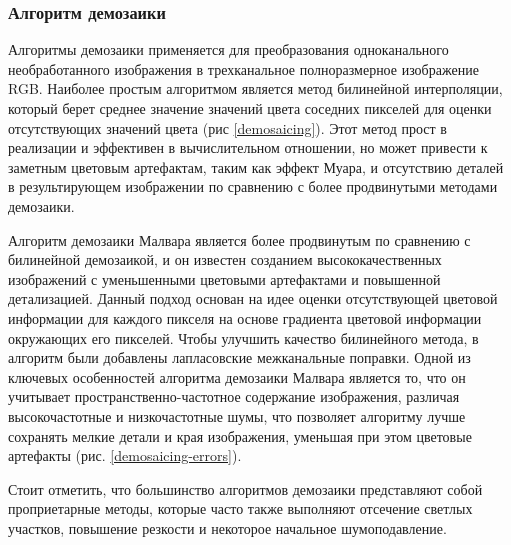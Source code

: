 \subsubsection{Алгоритм демозаики}

Алгоритмы демозаики \cite{lib-demosaic} применяется для преобразования одноканального необработанного изображения в трехканальное полноразмерное изображение RGB. Наиболее простым алгоритмом является метод билинейной интерполяции, который берет среднее значение значений цвета соседних пикселей для оценки отсутствующих значений цвета (рис \ref{demosaicing}). Этот метод прост в реализации и эффективен в вычислительном отношении, но может привести к заметным цветовым артефактам, таким как эффект Муара, и отсутствию деталей в результирующем изображении по сравнению с более продвинутыми методами демозаики.


Алгоритм демозаики Малвара является более продвинутым по сравнению с билинейной демозаикой, и он известен созданием высококачественных изображений с уменьшенными цветовыми артефактами и повышенной детализацией. Данный подход основан на идее оценки отсутствующей цветовой информации для каждого пикселя на основе градиента цветовой информации окружающих его пикселей. Чтобы улучшить качество билинейного метода, в алгоритм были добавлены лапласовские межканальные поправки. Одной из ключевых особенностей алгоритма демозаики Малвара является то, что он учитывает пространственно-частотное содержание изображения, различая высокочастотные и низкочастотные шумы, что позволяет алгоритму лучше сохранять мелкие детали и края изображения, уменьшая при этом цветовые артефакты (рис. \ref{demosaicing-errors}).


Стоит отметить, что большинство алгоритмов демозаики представляют собой проприетарные методы, которые часто также выполняют отсечение светлых участков, повышение резкости и некоторое начальное шумоподавление. 